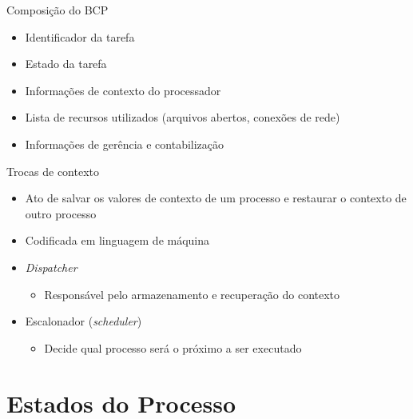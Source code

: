 \documentclass[aspectratio=169,
				xcolor=table]{beamer}
\begin{document}
	\begin{frame}{Composição do BCP}
		\begin{itemize}
			\item Identificador da tarefa
				\vspace{1em}
			\item Estado da tarefa
				\vspace{1em}
			\item Informações de contexto do processador
				\vspace{1em}
			\item Lista de recursos utilizados (arquivos abertos, conexões de rede)
				\vspace{1em}
			\item Informações de gerência e contabilização
		\end{itemize}
	\end{frame}
	
	\begin{frame}{Trocas de contexto}
		 \begin{itemize}
		 	\item Ato de salvar os valores de contexto de um processo e restaurar o contexto de outro processo
		 	\vspace{1em}
		 	\item Codificada em linguagem de máquina
		 	\vspace{1em}
		 	\item \textit{Dispatcher}
		 	\begin{itemize}
		 		\item Responsável pelo armazenamento e recuperação do contexto
		 	\end{itemize}
		 	\vspace{1em}
		 	\item Escalonador (\textit{scheduler})
		 	\begin{itemize}
		 		\item Decide qual processo será o próximo a ser executado
		 	\end{itemize}
		 \end{itemize}
	\end{frame}

	\section{Estados do Processo}	
	
\end{document}
